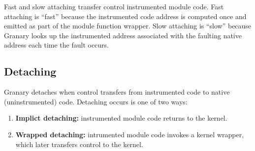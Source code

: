 \documentclass{sigplanconf}
\begin{document}
Fast and slow attaching transfer control instrumented module code. Fast attaching is ``fast'' because the instrumented code address is computed once and emitted as part of the module function wrapper. Slow attaching is ``slow'' because Granary looks up the instrumented address associated with the faulting native address each time the fault occurs.

\subsection{Detaching}

Granary detaches when control transfers from instrumented code to native (uninstrumented) code. Detaching occurs is one of two ways: \begin{enumerate}
	\item {\bf Implict detaching:} instrumented module code returns to the kernel.
	\item {\bf Wrapped detaching:} intrumented module code invokes a kernel wrapper, which later transfers control to the kernel.
\end{enumerate}




\end{document}
